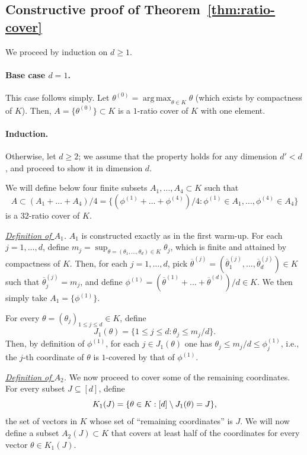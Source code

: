 \documentclass[11pt]{article}
\renewcommand{\leq}{\leqslant}
\renewcommand{\geq}{\geqslant}
\newcommand{\argmax}{\mathop{\mathrm{arg}\,\mathrm{max}}}
\newcommand{\ol}{\overline}
\theoremstyle{definition}
\theoremstyle{remark}
\DeclarePairedDelimiter{\set}{\{}{\}}
\begin{document}
\subsection{Constructive proof of Theorem~\ref{thm:ratio-cover}}\label{subsection:ratio-proof}
  We proceed by induction on $d \geq 1$.

  \paragraph{Base case $d=1$.}
  This case follows simply. Let $\theta^{(0)} = \argmax_{\theta \in K} \theta$ (which exists by compactness of $K$).
  Then, $A = \{ \theta^{(0)} \} \subset K$ is a $1$-ratio cover of $K$ with one element.

  \paragraph{Induction.}
  Otherwise, let $d \geq 2$; we assume that the property holds for any dimension $d' < d$, and proceed to show it in dimension $d$.

  We will define below four finite subsets $A_1, \dots, A_4 \subset K$ such that 
  \[A \subset (A_1 + \dots + A_4)/4 = \{ (\phi^{(1)}+ \dots + \phi^{(4)})/4 : \phi^{(1)} \in A_1, \dots, \phi^{(4)} \in A_4 \}\]
  is a $32$-ratio cover of $K$.

  \emph{\underline{Definition of $A_1$}.}
  $A_1$ is constructed exactly as in the first warm-up. For each $j=1, \dots, d$, define $m_j = \sup_{\theta = (\theta_1, \dots, \theta_d) \in K} \theta_j$, which is finite and attained by compactness of $K$.
  Then, for each $j=1, \dots, d$, pick $\ol \theta^{(j)} = (\ol \theta_1^{(j)},\dots,\ol \theta_d^{(j)}) \in K$ such that $\ol \theta_{j}^{(j)} = m_j$, and define $\phi^{(1)} = (\ol\theta^{(1)} + \dots + \ol \theta^{(d)})/d \in K$.
  We then simply take $A_1 = \{ \phi^{(1)} \}$.

  For every $\theta = (\theta_j)_{1 \leq j \leq d} \in K$, define 
  \[J_1 (\theta) = \{ 1 \leq j \leq d : \theta_j \leq m_j/d \}.\]
  Then, by definition of $\phi^{(1)}$, for each $j \in J_1 (\theta)$ one has $\theta_j \leq m_j/d \leq \phi_{j}^{(1)}$,
  i.e., the $j$-th coordinate of $\theta$ is $1$-covered by that of $\phi^{(1)}$.

  \emph{\underline{Definition of $A_2$}.}
  We now proceed to cover some of the remaining coordinates.
  For every subset $J \subseteq [d]$, define 
  \[K_1 (J) = \set{\theta \in K : [d] \setminus J_1 (\theta) = J},\]
  the set of vectors in $K$ whose set of ``remaining coordinates'' is $J$.
  We will now define a subset $A_2 (J) \subset K$ that covers at least half of the coordinates for every vector $\theta \in K_1 (J)$.
  
\end{document}
